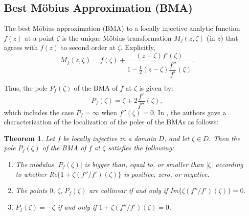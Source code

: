 \documentclass[reqno]{amsart}
\theoremstyle{plain}
\newtheorem{theoA}{Theorem}
\theoremstyle{definition}
\begin{document}
\subsection{Best Möbius Approximation (BMA)}

The best Möbius approximation (BMA) to a locally injective analytic function $f(z)$ at a point $\zeta$ is the unique Möbius transformation $M_f(z, \zeta)$ (in $z$) that agrees with $f(z)$ to second order at $\zeta$. Explicitly,
\begin{equation}
M_f(z, \zeta) = f(\zeta) + \frac{(z - \zeta)f'(\zeta)}{1 - \frac{1}{2}(z - \zeta)\dfrac{f''}{f'}(\zeta)}.
\end{equation}

Thus, the pole \( P_f(\zeta) \) of the BMA of \( f \) at \( \zeta \) is given by:
\[
P_f(\zeta) = \zeta + 2 \frac{f'}{f''}(\zeta),
\]
which includes the case \( P_f = \infty \) when \( f''(\zeta) = 0 \). In \cite{Chuaqui2024}, the authors gave a characterization of the localization of the poles of the BMAs as follows:

\begin{theoA} 
Let $f$ be locally injective in a domain $D$, and let $\zeta \in D$. Then the pole $P_f(\zeta)$ of the BMA of $f$ at $\zeta$ satisfies the following:
\begin{enumerate}[wide]
    \item [$(i)$] The modulus $|P_f(\zeta)|$ is bigger than, equal to, or smaller than $|\zeta|$ according to whether \textup{Re}$\{1 + \zeta (f''/f')(\zeta)\}$ is positive, zero, or negative.
    \item [$(ii)$]  The points $0, \, \zeta, \, P_f(\zeta)$ are collinear if and only if \textup{Im}$\{\zeta (f''/f')(\zeta)\} = 0$.
    \item [$(iii)$] $P_f(\zeta) = -\zeta$ if and only if $1 + \zeta (f''/f')(\zeta) = 0$.
\end{enumerate}
\end{theoA}
\end{document}
